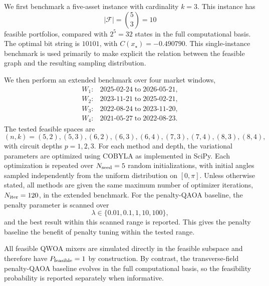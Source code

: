 We first benchmark a five-asset instance with cardinality \(k=3\). This
instance has
\begin{equation}
    |\mathcal{F}|=\binom{5}{3}=10
\end{equation}
feasible portfolios, compared with \(2^5=32\) states in the full computational
basis. The optimal bit string is \(10101\), with
\(C(x_\star)=-0.490790\). This single-instance benchmark is used primarily to
make explicit the relation between the feasible graph and the resulting
sampling distribution.

We then perform an extended benchmark over four market windows,
\begin{equation}
\begin{array}{ll}
W_1: & 2025\text{-}02\text{-}24\;\text{to}\;2026\text{-}05\text{-}21,\\
W_2: & 2023\text{-}11\text{-}21\;\text{to}\;2025\text{-}02\text{-}21,\\
W_3: & 2022\text{-}08\text{-}24\;\text{to}\;2023\text{-}11\text{-}20,\\
W_4: & 2021\text{-}05\text{-}27\;\text{to}\;2022\text{-}08\text{-}23.
\end{array}
\end{equation}
The tested feasible spaces are
\[
    (n,k)=(5,2),(5,3),(6,2),(6,3), (6,4),
    (7,3),(7,4),(8,3),(8,4),
\]
with circuit depths \(p=1,2,3\). For each method and depth, the variational parameters are optimized using
COBYLA as implemented in SciPy. Each optimization is repeated over
\(N_{\rm seed}=5\) random initializations, with initial angles sampled
independently from the uniform distribution on \([0,\pi]\). Unless otherwise
stated, all methods are given the same maximum number of optimizer iterations,
\(N_{\rm iter}=120\), in the extended benchmark. For the penalty-QAOA baseline,
the penalty parameter is scanned over
\begin{equation}
    \lambda\in\{0.01,0.1,1,10,100\},
\end{equation}
and the best result within this scanned range is reported. This gives the
penalty baseline the benefit of penalty tuning within the tested range.

All feasible QWOA mixers are simulated directly in the feasible subspace and
therefore have \(P_{\rm feasible}=1\) by construction. By contrast, the
transverse-field penalty-QAOA baseline evolves in the full computational basis,
so the feasibility probability is reported separately when informative.